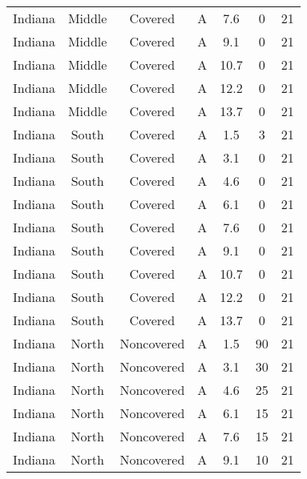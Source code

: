 \documentclass{article}
\begin{document}
\begin{longtable}[c]{ccccccc}
Indiana   & Middle    & Covered     & A               & 7.6          & 0           & 21  \\
Indiana   & Middle    & Covered     & A               & 9.1          & 0           & 21  \\
Indiana   & Middle    & Covered     & A               & 10.7         & 0           & 21  \\
Indiana   & Middle    & Covered     & A               & 12.2         & 0           & 21  \\
Indiana   & Middle    & Covered     & A               & 13.7         & 0           & 21  \\
Indiana   & South     & Covered     & A               & 1.5          & 3           & 21  \\
Indiana   & South     & Covered     & A               & 3.1          & 0           & 21  \\
Indiana   & South     & Covered     & A               & 4.6          & 0           & 21  \\
Indiana   & South     & Covered     & A               & 6.1          & 0           & 21  \\
Indiana   & South     & Covered     & A               & 7.6          & 0           & 21  \\
Indiana   & South     & Covered     & A               & 9.1          & 0           & 21  \\
Indiana   & South     & Covered     & A               & 10.7         & 0           & 21  \\
Indiana   & South     & Covered     & A               & 12.2         & 0           & 21  \\
Indiana   & South     & Covered     & A               & 13.7         & 0           & 21  \\
Indiana   & North     & Noncovered & A               & 1.5          & 90          & 21  \\
Indiana   & North     & Noncovered & A               & 3.1          & 30          & 21  \\
Indiana   & North     & Noncovered & A               & 4.6          & 25          & 21  \\
Indiana   & North     & Noncovered & A               & 6.1          & 15          & 21  \\
Indiana   & North     & Noncovered & A               & 7.6          & 15          & 21  \\
Indiana   & North     & Noncovered & A               & 9.1          & 10          & 21  \\

\end{longtable}
\end{document}
